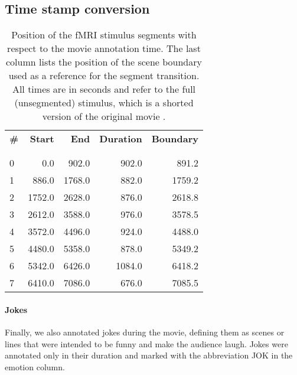 \subsection*{Time stamp conversion}

\begin{table}
  \centering
  \begin{tabular}{lrrrr}
    \textbf{\#}  & \textbf{Start}  & \textbf{End}    & \textbf{Duration}& \textbf{Boundary} \\
  \\\hline\\
   0  & 0.0    & 902.0  & 902.0  & 891.2    \\
   1  & 886.0  & 1768.0 & 882.0  & 1759.2   \\
   2  & 1752.0 & 2628.0 & 876.0  & 2618.8   \\
   3  & 2612.0 & 3588.0 & 976.0  & 3578.5   \\
   4  & 3572.0 & 4496.0 & 924.0  & 4488.0   \\
   5  & 4480.0 & 5358.0 & 878.0  & 5349.2   \\
   6  & 5342.0 & 6426.0 & 1084.0 & 6418.2   \\
   7  & 6410.0 & 7086.0 & 676.0  & 7085.5   \\
  \end{tabular}

  \caption{Position of the fMRI stimulus segments with respect to the movie
    annotation time. The last column lists the position of the scene boundary
    used as a reference for the segment transition. All times are in seconds
    and refer to the full (unsegmented) stimulus, which is a shorted version of
    the original movie \cite{HBI+14}.}

  \label{tab:timing}
\end{table}

\paragraph{Jokes}
Finally, we also annotated jokes during the movie, defining them as scenes or lines that were intended to be funny and make the audience laugh. Jokes were annotated only in their duration and marked with the abbreviation JOK in the emotion column. 


